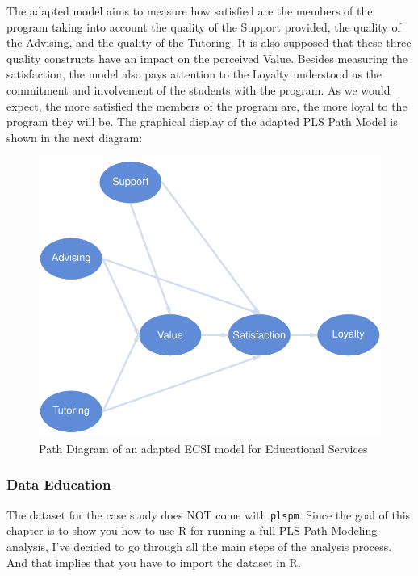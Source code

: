 \documentclass[12pt]{book}\usepackage{graphicx, color}
\newenvironment{knitrout}{}{} %
\newcommand{\plspm}{\texttt{plspm}}
\begin{document}
The adapted model aims to measure how satisfied are the members of the program taking into account the quality of the Support provided, the quality of the Advising, and the quality of the Tutoring. It is also supposed that these three quality constructs have an impact on the perceived Value. Besides measuring the satisfaction, the model also pays attention to the Loyalty understood as the commitment and involvement of the students with the program. As we would expect, the more satisfied the members of the program are, the more loyal to the program they will be. The graphical display of the adapted PLS Path Model is shown in the next diagram:
\begin{knitrout}
\color{fgcolor}\begin{figure}[h]


{\centering \includegraphics[width=.85\linewidth,height=.5\linewidth]{figure/education_path_diagram} 

}

\caption[Path Diagram of an adapted ECSI model for Educational Services]{Path Diagram of an adapted ECSI model for Educational Services\label{fig:education_path_diagram}}
\end{figure}


\end{knitrout}




\subsubsection*{Data Education}
The dataset for the case study does NOT come with \plspm{}. Since the goal of this chapter is to show you how to use R for running a full PLS Path Modeling analysis, I've decided to go through all the main steps of the analysis process. And that implies that you have to import the dataset in R.
\end{document}
